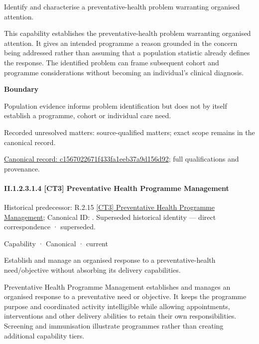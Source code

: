 Identify and characterise a preventative-health problem warranting organised attention.



This capability establishes the preventative-health problem warranting organised attention. It gives an intended programme a reason grounded in the concern being addressed rather than assuming that a population statistic already defines the response. The identified problem can frame subsequent cohort and programme considerations without becoming an individual's clinical diagnosis.



\textbf{Boundary}



Population evidence informs problem identification but does not by itself establish a programme, cohort or individual care need.


{\small Recorded unresolved matters: source-qualified matters; exact scope remains in the canonical record.}\par
{\footnotesize \href{../../../../continuum/strategy/capability/c1567022671f433fa1eeb37a9d156d92.md}{Canonical record: c1567022671f433fa1eeb37a9d156d92}; full qualifications and provenance.}\par
\paragraph*{II.1.2.3.1.4 [CT3] Preventative Health Programme Management}
\label{navigation:II.1.2.3.1.4}

{\small Historical predecessor: R.2.15 \hyperref[element:d71def9e76a544ff9761c672bb24f3be]{[CT3] Preventative Health Programme Management}; Canonical ID: \texttt{}. Superseded historical identity — direct correspondence · superseded.}\par
\label{element:563d36b179d34cb6913253d06e8d77f6}
{\small Capability · Canonical · current}\par

Establish and manage an organised response to a preventative-health need/objective without absorbing its delivery capabilities.



Preventative Health Programme Management establishes and manages an organised response to a preventative need or objective. It keeps the programme purpose and coordinated activity intelligible while allowing appointments, interventions and other delivery abilities to retain their own responsibilities. Screening and immunisation illustrate programmes rather than creating additional capability tiers.



